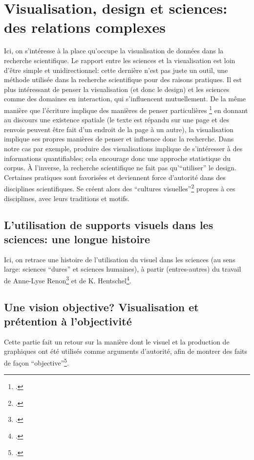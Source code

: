 \documentclass[a4paper, 12pt, twoside]{book}
\begin{document}
\section{Visualisation, design et sciences: des relations complexes}
Ici, on s'intéresse à la place qu'occupe la visualisation de données dans la recherche scientifique. Le rapport entre les sciences et la visualisation est loin d'être simple et unidirectionnel: cette dernière n'est pas juste un outil, une méthode utilisée dans la recherche scientifique pour des raisons pratiques. Il est plus intéressant de penser la visualisation (et donc le design) et les sciences comme des domaines en interaction, qui s'influencent mutuellement. De la même manière que l'écriture implique des manières de penser particulières \footcite[p. 111-116]{masure_design_2017} en donnant au discours une existence spatiale (le texte est répandu sur une page et des renvois peuvent être fait d'un endroit de la page à un autre), la visualisation implique ses propres manières de penser et influence donc la recherche. Dans notre cas par exemple, produire des visualisations implique de s'intéresser à des informations quantifiables; cela encourage donc une approche statistique du corpus. À l'inverse, la recherche scientifique ne fait pas qu'\enquote{utiliser} le design. Certaines pratiques sont favorisées et deviennent force d'autorité dans des disciplines scientifiques. Se créent alors des \enquote{cultures visuelles}\footcite[p. 14]{hentschel_visual_2014} propres à ces disciplines, avec leurs traditions et motifs.

\subsection{L'utilisation de supports visuels dans les sciences: une longue histoire}
Ici, on retrace une histoire de l'utilisation du visuel dans les sciences (au sens large: sciences \enquote{dures} et sciences humaines), à partir (entres-autres) du travail de Anne-Lyse Renon\footcite[p. 47-88]{renon_design_2016} et de K. Hentschel\footcite{hentschel_visual_2014}.

\subsection{Une vision objective? Visualisation et prétention à l'objectivité}
Cette partie fait un retour sur la manière dont le visuel et la production de graphiques ont été utilisés comme arguments d'autorité, afin de montrer des faits de façon \enquote{objective}\footcite{renon_design_2015}.
\end{document}
